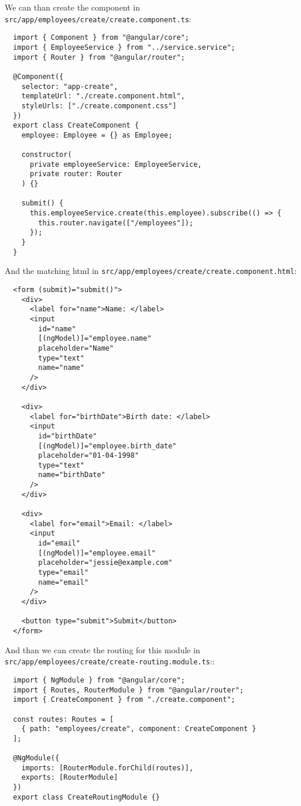 We can than create the component in \texttt{src/app/employees/create/create.component.ts}:
\begin{verbatim}
  import { Component } from "@angular/core";
  import { EmployeeService } from "../service.service";
  import { Router } from "@angular/router";

  @Component({
    selector: "app-create",
    templateUrl: "./create.component.html",
    styleUrls: ["./create.component.css"]
  })
  export class CreateComponent {
    employee: Employee = {} as Employee;

    constructor(
      private employeeService: EmployeeService,
      private router: Router
    ) {}

    submit() {
      this.employeeService.create(this.employee).subscribe(() => {
        this.router.navigate(["/employees"]);
      });
    }
  }
\end{verbatim}

And the matching html in \texttt{src/app/employees/create/create.component.html}:
\begin{verbatim}
  <form (submit)="submit()">
    <div>
      <label for="name">Name: </label>
      <input
        id="name"
        [(ngModel)]="employee.name"
        placeholder="Name"
        type="text"
        name="name"
      />
    </div>

    <div>
      <label for="birthDate">Birth date: </label>
      <input
        id="birthDate"
        [(ngModel)]="employee.birth_date"
        placeholder="01-04-1998"
        type="text"
        name="birthDate"
      />
    </div>

    <div>
      <label for="email">Email: </label>
      <input
        id="email"
        [(ngModel)]="employee.email"
        placeholder="jessie@example.com"
        type="email"
        name="email"
      />
    </div>

    <button type="submit">Submit</button>
  </form>
\end{verbatim}

And than we can create the routing for this module in \texttt{src/app/employees/create/create-routing.module.ts}::
\begin{verbatim}
  import { NgModule } from "@angular/core";
  import { Routes, RouterModule } from "@angular/router";
  import { CreateComponent } from "./create.component";

  const routes: Routes = [
    { path: "employees/create", component: CreateComponent }
  ];

  @NgModule({
    imports: [RouterModule.forChild(routes)],
    exports: [RouterModule]
  })
  export class CreateRoutingModule {}
\end{verbatim}

